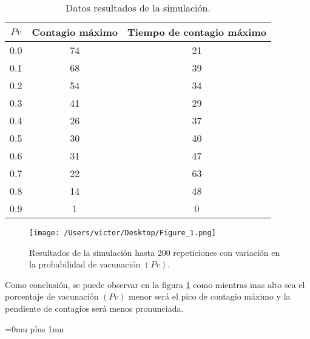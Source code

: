\documentclass{article}
\begin{document}
\begin{table}[H]
\centering
\caption{Datos resultados de la simulación.}
\label{fig:cuadro1}
\begin{tabular}{|c|c|c|}
\hline
$Pv$ & Contagio máximo & Tiempo de contagio máximo\\
\hline
0.0& 74 & 21\\
0.1& 68 & 39\\
0.2& 54 & 34\\
0.3& 41 & 29\\
0.4& 26 & 37\\
0.5& 30 & 40\\
0.6& 31 & 47\\
0.7& 22 & 63\\
0.8& 14 & 48\\
0.9& 1 & 0\\

\hline
\end{tabular}
\end{table}



\begin{figure}[H]
\begin{center}
	\texttt{[image: /Users/victor/Desktop/Figure\_1.png]}
	\caption{ Resultados de la simulación hasta 200 repeticiones con variación en la probabilidad de vacunación  $(Pv)$.}
	\label{fig:cuadro.1}
\end{center}
\end{figure}

Como conclusión, se puede observar en la  figura \ref{fig:cuadro.1} como mientras mas alto sea el porcentaje de vacunación $(Pv)$ menor será el pico de contagio máximo y la pendiente de contagios será menos pronunciada. 

\Urlmuskip=0mu plus 1mu\relax


\end{document}
